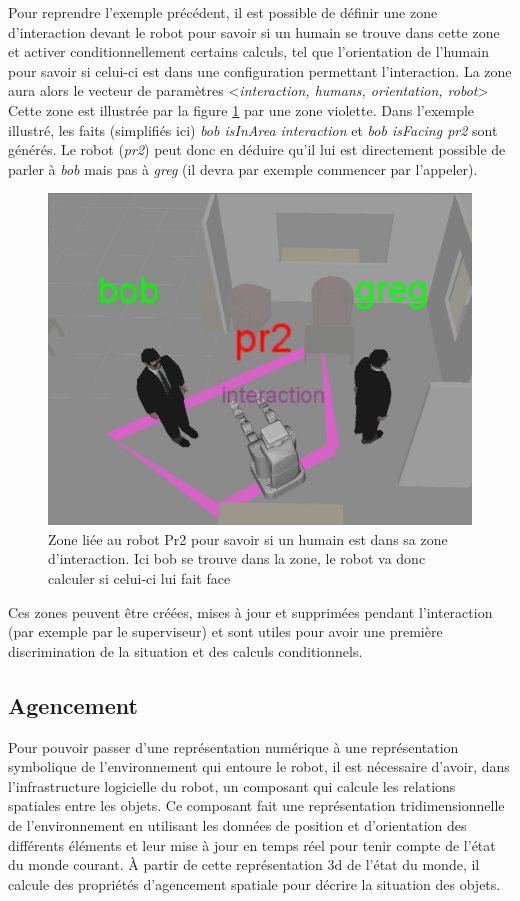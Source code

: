 \documentclass[a4paper,11pt,twoside]{StyleThese}
\begin{document}
Pour reprendre l'exemple précédent, il est possible de définir une zone d'interaction devant le robot pour savoir si un humain se trouve dans cette zone et activer conditionnellement certains calculs, tel que l'orientation de l'humain pour savoir si celui-ci est dans une configuration permettant l'interaction.
La zone aura alors le vecteur de paramètres <\textit{interaction, humans, orientation, robot}>
Cette zone est illustrée par la figure \ref{fig:interaction} par une zone violette.
Dans l'exemple illustré, les faits (simplifiés ici) \textit{bob isInArea interaction} et \textit{bob isFacing pr2} sont générés. Le robot (\textit{pr2}) peut donc en déduire qu'il lui est directement possible de parler à \textit{bob} mais pas à \textit{greg} (il devra par exemple commencer par l'appeler).


\begin{figure}[ht!]
 \centering
  \includegraphics[width=0.69\linewidth]{./img/interactionarea.jpg} 
  \caption {Zone liée au robot Pr2 pour savoir si un humain est dans sa zone d'interaction. Ici bob se trouve dans la zone, le robot va donc calculer si celui-ci lui fait face}
  \label{fig:interaction}
\end{figure}

Ces zones peuvent être créées, mises à jour et supprimées pendant l'interaction (par exemple par le superviseur) et sont utiles pour avoir une première discrimination de la situation et des calculs conditionnels.


\subsection{Agencement}
\label{sec:agencement}
Pour pouvoir passer d'une représentation numérique à une représentation symbolique de l'environnement qui entoure le robot, il est nécessaire d'avoir, dans l'infrastructure logicielle du robot, un composant qui calcule les relations spatiales entre les objets. Ce composant fait une représentation tridimensionnelle de l'environnement en utilisant les données de position et d'orientation des différents éléments et leur mise à jour en temps réel pour tenir compte de l'état du monde courant. À partir de cette représentation 3d de l'état du monde, il calcule des propriétés d'agencement spatiale pour décrire la situation des objets.
\end{document}

